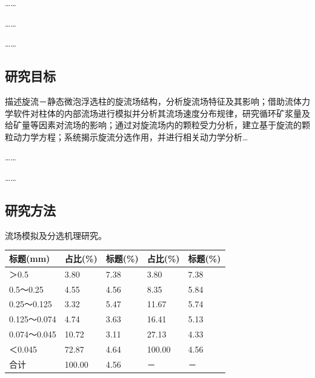 ……

……

……

\subsection{研究目标}
描述旋流－静态微泡浮选柱的旋流场结构，分析旋流场特征及其影响\cite{acharya2020acid}；借助流体力学软件对柱体的内部流场进行模拟并分析其流场速度分布规律，研究循环矿浆量及给矿量等因素对流场的影响\cite{betz2015coal,li2021characteristics}；通过对旋流场内的颗粒受力分析，建立基于旋流的颗粒动力学方程\cite{mohutsiwa2015parametric,xie2012research,中国社会科学院台湾史研究中心2012台湾光复六十五周年暨抗战史实学术研讨会论文集}；系统揭示旋流分选作用，并进行相关动力学分析\cite{younger2004environmental,关立哲2014科技期刊编辑审读中要注重比较思维的科学运用}…

……

……

\vspace*{3cm} %


\subsection{研究方法}

流场模拟及分选机理研究\cite{谢和平20192025年中国能源消费及煤炭需求预测}。

\begin{table}[H]
    \renewcommand\arraystretch{1.259}
    \centering
    \label{table: table_1}  
    \begin{tabularx}{0.8\textwidth}{m{3cm}XXXX}
        \toprule[1.5pt]
        标题(mm)       & 占比(\%)   & 标题(\%) & 占比(\%)   & 标题(\%) \\
        \midrule[0.75pt]
        ＞0.5        & 3.80   & 7.38 & 3.80   & 7.38 \\
        0.5～0.25    & 4.55   & 4.56 & 8.35   & 5.84 \\
        0.25～0.125  & 3.32   & 5.47 & 11.67  & 5.74 \\
        0.125～0.074 & 4.74   & 3.63 & 16.41  & 5.13 \\
        0.074～0.045 & 10.72  & 3.11 & 27.13  & 4.33 \\
        ＜0.045      & 72.87  & 4.64 & 100.00 & 4.56 \\
        合计          & 100.00 & 4.56 & －      & －   \\
        \bottomrule[1.5pt]
    \end{tabularx}
\end{table}

